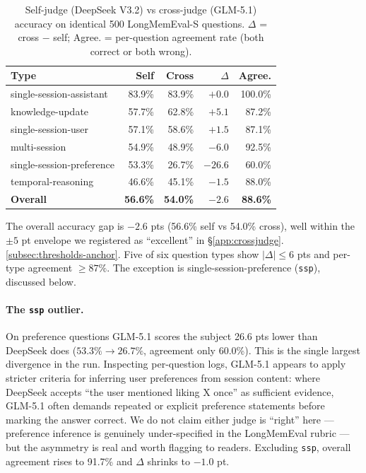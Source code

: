 \begin{table}[h]
\centering
\small
\begin{tabular}{lrrrr}
\toprule
\textbf{Type} & \textbf{Self} & \textbf{Cross} & \textbf{\(\Delta\)} & \textbf{Agree.} \\
\midrule
single-session-assistant     & 83.9\% & 83.9\% & $+0.0$  & 100.0\% \\
knowledge-update             & 57.7\% & 62.8\% & $+5.1$  & 87.2\%  \\
single-session-user          & 57.1\% & 58.6\% & $+1.5$  & 87.1\%  \\
multi-session                & 54.9\% & 48.9\% & $-6.0$  & 92.5\%  \\
single-session-preference    & 53.3\% & 26.7\% & $-26.6$ & 60.0\%  \\
temporal-reasoning           & 46.6\% & 45.1\% & $-1.5$  & 88.0\%  \\
\midrule
\textbf{Overall}             & \textbf{56.6\%} & \textbf{54.0\%} & \textbf{$-2.6$} & \textbf{88.6\%} \\
\bottomrule
\end{tabular}
\caption{Self-judge (DeepSeek V3.2) vs cross-judge (GLM-5.1) accuracy
on identical 500 LongMemEval-S questions. \(\Delta\) = cross $-$ self;
Agree. = per-question agreement rate (both correct or both wrong).}
\label{tab:crossjudge}
\end{table}

The overall accuracy gap is $-2.6$ pts (56.6\% self vs 54.0\% cross),
well within the $\pm5$ pt envelope we registered as ``excellent'' in
§\ref{app:crossjudge}.\ref{subsec:thresholds-anchor}. Five of six
question types show $|\Delta| \leq 6$ pts and per-type agreement
$\geq 87\%$. The exception is single-session-preference (\texttt{ssp}),
discussed below.

\paragraph{The \texttt{ssp} outlier.} On preference questions GLM-5.1
scores the subject 26.6 pts lower than DeepSeek does ($53.3\% \to
26.7\%$, agreement only 60.0\%). This is the single largest divergence
in the run. Inspecting per-question logs, GLM-5.1 appears to apply
stricter criteria for inferring user preferences from session content:
where DeepSeek accepts ``the user mentioned liking X once''
as sufficient evidence, GLM-5.1 often demands repeated or explicit
preference statements before marking the answer correct. We do not
claim either judge is ``right'' here --- preference inference is
genuinely under-specified in the LongMemEval rubric --- but the
asymmetry is real and worth flagging to readers. Excluding \texttt{ssp},
overall agreement rises to 91.7\% and \(\Delta\) shrinks to $-1.0$ pt.

